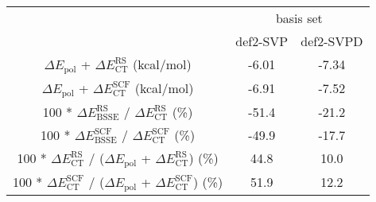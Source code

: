 \begin{tabular}{ccc}
\toprule
& \multicolumn{2}{c}{basis set} \\
& def2-SVP & def2-SVPD \\
\midrule
\(\Delta E_{\textrm{pol}}\) + \(\Delta E_{\textrm{CT}}^{\textrm{RS}}\) (kcal/mol) & -6.01 & -7.34 \\
\(\Delta E_{\textrm{pol}}\) + \(\Delta E_{\textrm{CT}}^{\textrm{SCF}}\) (kcal/mol) & -6.91 & -7.52 \\
100 * \(\Delta E_{\textrm{BSSE}}^{\textrm{RS}}\) / \(\Delta E_{\textrm{CT}}^{\textrm{RS}}\) (\%) & -51.4 & -21.2 \\
100 * \(\Delta E_{\textrm{BSSE}}^{\textrm{SCF}}\) / \(\Delta E_{\textrm{CT}}^{\textrm{SCF}}\) (\%) & -49.9 & -17.7 \\
100 * \(\Delta E_{\textrm{CT}}^{\textrm{RS}}\) / (\(\Delta E_{\textrm{pol}}\) + \(\Delta E_{\textrm{CT}}^{\textrm{RS}}\)) (\%) & 44.8 & 10.0 \\
100 * \(\Delta E_{\textrm{CT}}^{\textrm{SCF}}\) / (\(\Delta E_{\textrm{pol}}\) + \(\Delta E_{\textrm{CT}}^{\textrm{SCF}}\)) (\%) & 51.9 & 12.2 \\
\bottomrule
\end{tabular}
